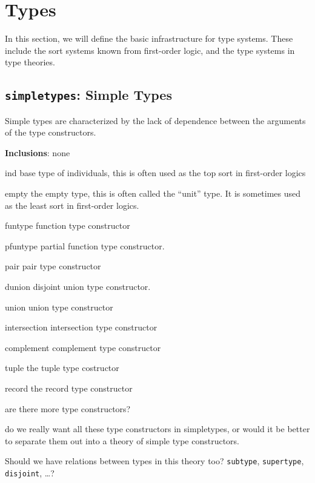 \documentclass{article}
\begin{document}
\section{Types}
In this section, we will define the basic infrastructure for type systems. These
include the sort systems known from first-order logic, and the type systems in
type theories.

\subsection{{\tt{simpletypes}}: Simple Types}
Simple types are characterized by the lack of dependence between the arguments of
the type constructors.

{\bf Inclusions}: none
\begin{constlist}
  \item[ind] base type of individuals, this is often used as the top sort in
    first-order logics
  \item[empty] the empty type, this is often called the ``unit'' type. It is
    sometimes used as the least sort in first-order logics.
  \item[funtype] function type constructor
  \item[pfuntype] partial function type constructor.
  \item[pair] pair type constructor
  \item[dunion] disjoint union type constructor.
  \item[union] union type constructor
  \item[intersection] intersection type constructor
  \item[complement] complement type constructor
  \item[tuple] the tuple type costructor
  \item[record] the record type constructor
\end{constlist}

\begin{todolist}{}
  \item are there more type constructors?
  \item do we really want all these type constructors in simpletypes, or would it
    be better to separate them out into a theory of simple type constructors.
  \item Should we have relations between types in this theory too? {\tt{subtype}},
  {\tt{supertype}}, {\tt{disjoint}}, \ldots?
\end{todolist}
\end{document}
